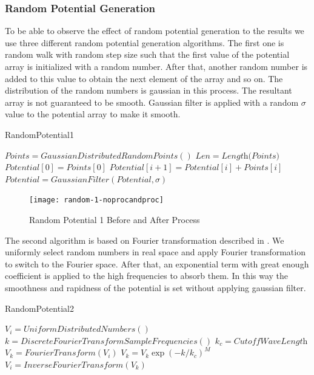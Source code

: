 \documentclass[a4paper,times,hidelinks,12pt]{article}
\begin{document}
\subsubsection{Random Potential Generation}
\label{sec:random_potential_gen}

To be able to observe the effect of random potential generation to the results we use three different random potential generation algorithms. The first one is random walk with random step size such that the first value of the potential array is initialized with a random number. After that, another random number is added to this value to obtain the next element of the array and so on. The distribution of the random numbers is gaussian in this process. The resultant array is not guaranteed to be smooth. Gaussian filter is applied with a random $\sigma$ value to the potential array to make it smooth.    

\begin{algorithm}[H]
    \caption{RandomPotential1}\label{euclid}
    \begin{algorithmic}[1]
        \State $ Points = GaussianDistributedRandomPoints()$
        \State $Len = \textit{Length(Points)}$
        \State $Potential[0] = Points[0]$
        \State $Potential[i + 1] = Potential[i] + Points[i]$
        \EndFor
        \State $Potential = GaussianFilter(Potential, \sigma)$ 
    \EndProcedure
    \end{algorithmic}
\label{alg:random_potential_1}
\end{algorithm}

\graphicspath{{"../figs/potentials/"}}
\begin{figure}[H]
    \centering
        \texttt{[image: random-1-noprocandproc]}
\caption{Random Potential 1 Before and After Process}
\label{fig:random1_before_after}
\end{figure}

The second algorithm is based on Fourier transformation described in \cite{akkermans2008numerical}. We uniformly select random numbers in real space and apply Fourier transformation to switch to the Fourier space. After that, an exponential term with great enough coefficient is applied to the high frequencies to absorb them. In this way the smoothness and rapidness of the potential is set without applying gaussian filter.

\begin{algorithm}[H]
    \caption{RandomPotential2}\label{euclid}
    \begin{algorithmic}[1]
        \State $V_i = UniformDistributedNumbers()$
        \State $k = DiscreteFourierTransformSampleFrequencies()$
        \State $k_c = \textit{CutoffWaveLength}$
        \State $V_k = FourierTransform(V_i)$
        \State $V_k = V_k \exp(-k/k_c)^M$
        \State $V_i = InverseFourierTransform(V_k)$
    \EndProcedure
    \end{algorithmic}
\label{alg:random_potential_1}
\end{algorithm}
\end{document}
